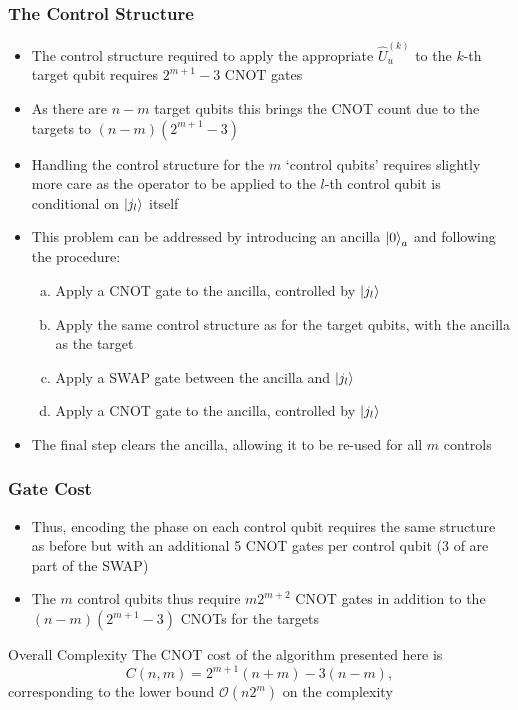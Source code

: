 \documentclass{beamer}
\begin{document}
\begin{frame}
\frametitle{The Control Structure}
\begin{itemize}
\item The control structure required to apply the appropriate $\hat{U}^{(k)}_u$ to the $k$-th target qubit requires \alert{$2^{m+1} -3$ CNOT gates}  
\item As there are $n-m$ target qubits this brings the CNOT count due to the targets to \alert{$(n-m) (2^{m+1}-3)$} 
\item Handling the control structure for the $m$ \alert{`control qubits'} requires slightly more care as the operator to be applied to the $l$-th control qubit is conditional on $\ket{j_l}$ itself 
\item This problem can be addressed by introducing an \alert{ancilla $\ket{0}_a$} and following the procedure:
\begin{enumerate}[(a)]
\item Apply a CNOT gate to the ancilla, controlled by $\ket{j_l}$
\item Apply the same control structure as for the target qubits, with the ancilla as the target 
\item Apply a SWAP gate between the ancilla and $\ket{j_l}$ 
\item Apply a CNOT gate to the ancilla, controlled by $\ket{j_l}$
\end{enumerate}
\item The final step clears the ancilla, allowing it to be \alert{re-used for all $m$} controls
\end{itemize}
\end{frame}

\begin{frame}
\frametitle{Gate Cost}
\begin{itemize}
\item Thus, encoding the phase on each control qubit requires the same structure as before but with an \alert{additional 5 CNOT} gates per control qubit (3 of are part of the SWAP)
\item The $m$ control qubits thus require \alert{$m 2^{m+2}$ CNOT} gates in addition to the \alert{$(n-m) (2^{m+1} -3)$ CNOTs} for the targets
\end{itemize}
\begin{alertblock}{Overall Complexity}
The CNOT cost of the algorithm presented here is 
\begin{equation}
C(n,m) = 2^{m+1} ( n+m) - 3 (n-m), 
\end{equation}
corresponding to the lower bound $\mathcal{O}(n2^m)$ on the complexity
\end{alertblock}
\end{frame}
\end{document}
